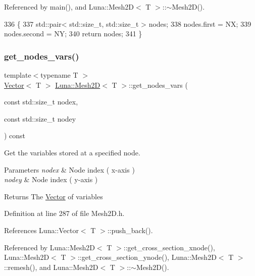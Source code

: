 Referenced by main(), and Luna\+::\+Mesh2\+D$<$ T $>$\+::$\sim$\+Mesh2\+D().


\begin{DoxyCode}
336   \{
337     std::pair< std::size\_t, std::size\_t > nodes;
338     nodes.first = NX;
339     nodes.second = NY;
340     \textcolor{keywordflow}{return} nodes;
341   \}
\end{DoxyCode}
\mbox{\label{classLuna_1_1Mesh2D_ae91c7515960ecedf43e4ed3f411080a1}} 
\subsubsection{\texorpdfstring{get\+\_\+nodes\+\_\+vars()}{get\_nodes\_vars()}}
{\footnotesize\ttfamily template$<$typename T $>$ \\
\hyperlink{classLuna_1_1Vector}{Vector}$<$ T $>$ \hyperlink{classLuna_1_1Mesh2D}{Luna\+::\+Mesh2D}$<$ T $>$\+::get\+\_\+nodes\+\_\+vars (\begin{DoxyParamCaption}\item[{const std\+::size\+\_\+t}]{nodex,  }\item[{const std\+::size\+\_\+t}]{nodey }\end{DoxyParamCaption}) const}



Get the variables stored at a specified node. 


\begin{DoxyParams}{Parameters}
{\em nodex} & Node index ( x-\/axis ) \\
\hline
{\em nodey} & Node index ( y-\/axis ) \\
\hline
\end{DoxyParams}
\begin{DoxyReturn}{Returns}
The \hyperlink{classLuna_1_1Vector}{Vector} of variables 
\end{DoxyReturn}


Definition at line 287 of file Mesh2\+D.\+h.



References Luna\+::\+Vector$<$ T $>$\+::push\+\_\+back().



Referenced by Luna\+::\+Mesh2\+D$<$ T $>$\+::get\+\_\+cross\+\_\+section\+\_\+xnode(), Luna\+::\+Mesh2\+D$<$ T $>$\+::get\+\_\+cross\+\_\+section\+\_\+ynode(), Luna\+::\+Mesh2\+D$<$ T $>$\+::remesh(), and Luna\+::\+Mesh2\+D$<$ T $>$\+::$\sim$\+Mesh2\+D().


